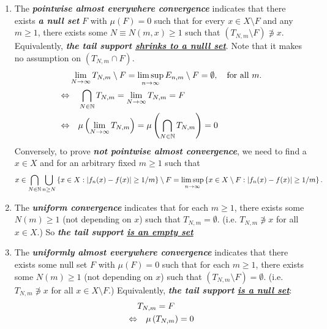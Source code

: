 \documentclass[11pt]{article}
\begin{document}
\begin{itemize}
\begin{remark}
\begin{enumerate}
\item The \emph{\textbf{pointwise almost everywhere convergence}} indicates that there exists \emph{\textbf{a null set}} $F$ with $\mu(F) = 0$ such that for every $x \in X \setminus F$ and any  $m\ge 1$, there exists some $N \equiv N(m,x)\ge 1$ such that  $(T_{N,m}\setminus F) \not\ni x$. Equivalently, \emph{\textbf{the tail support \underline{shrinks to a nulll set}}}. Note that it makes no assumption on $(T_{N,m}\cap F)$. 
\begin{align*}
&\lim\limits_{N\rightarrow \infty}T_{N,m} \setminus F = \limsup\limits_{n\rightarrow \infty}E_{n,m} \setminus F = \emptyset, \quad \text{for all }m.\\
\Leftrightarrow &\quad \bigcap_{N \in {\mathbb N}}T_{N,m} =   \lim\limits_{N\rightarrow \infty}T_{N,m} = F \\
\Leftrightarrow &\quad \mu\left( \lim\limits_{N\rightarrow \infty}T_{N,m}\right) = \mu\left( \bigcap_{N \in {\mathbb N}}T_{N,m}\right) = 0
\end{align*} Conversely, %
to prove \emph{\textbf{not pointwise almost convergence}},  we need to find a $x \in X$ and for an arbitrary fixed $m \ge 1$ such that 
\begin{align*}
x \in \bigcap_{N  \in {\mathbb N}}\bigcup_{n\ge N}\left\{x \in X: \left\lvert f_n(x) - f(x) \right\rvert \ge 1/m\right\} \setminus F = \limsup\limits_{n\rightarrow \infty}\left\{x \in X\setminus F: \left\lvert f_n(x) - f(x) \right\rvert \ge 1/m\right\}.
\end{align*} 

\item The \emph{\textbf{uniform convergence}} indicates that for each $m\ge 1$, there exists some $N(m)\ge 1$ (not depending on $x$) such that $T_{N,m} = \emptyset$. (i.e. $T_{N,m} \not\ni x$ for all $x \in X$.) So \emph{\textbf{the tail support \underline{is an empty set}}}


\item The \emph{\textbf{uniformly almost everywhere convergence}} indicates that there exists some null set $F$ with $\mu(F) =0$ such that for each $m\ge 1$, there exists some $N(m)\ge 1$ (not depending on $x$) such that $(T_{N,m}  \setminus F) = \emptyset$. (i.e. $T_{N,m}\not\ni x$ for all $x \in X \setminus F$.) Equivalently, \emph{\textbf{the tail support \underline{is a null set}}}: 
\begin{align*}
& T_{N,m} = F \\
\Leftrightarrow &\quad \mu\left(T_{N,m}\right) = 0
\end{align*}



\end{enumerate}
\end{remark}
\end{itemize}
\end{document}
